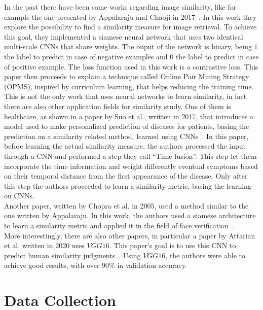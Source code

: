\documentclass[conference]{IEEEtran}
\begin{document}
				\noindent In the past there have been some works regarding image similarity, like for example the one presented by Appalaraju and Chaoji in 2017~\cite{appalaraju2017image}. In this work they explore the possibility to 
				find a similarity measure for image retrieval. To achieve this goal, they implemented a siamese neural network that uses two identical multi-scale CNNs that share weights. The ouput of the 
				network is binary, being $1$ the label to predict in case of negative examples and $0$ the label to predict in case of positive example. The loss function used in this work is a contrastive loss. This paper 
				then proceeds to explain a technique called Online Pair Mining Strategy (OPMS), inspired by curriculum learning, that helps reducing the training time. \\
				This is not the only work that uses neural networks to learn similarity, in fact there are also other application fields for similarity study. One of them is healthcare, as shown in a paper by Suo et al., written in 
				2017, that introduces a model used to make personalized prediction of diseases for patients, basing the prediction on a similarity related method, learned using CNNs~\cite{8217759}. In this paper, before 
				learning the actual similarity measure, the authors processed the input through a CNN and performed a step they call ``Time fusion''. This step let them incorporate the time information and 
				weight differently eventual symptoms based on their temporal distance from the first appearance of the disease. Only after this step the authors proceeded to learn a similarity metric, basing the learning 
				on CNNs.\\
				Another paper, written by Chopra et al. in 2005, used a method similar to the one written by Appalaraju. In this work, the authors used a siamese architecture to learn a similarity metric and applied it 
				in the field of face verification~\cite{chopra2005learning}.\\
				More interestingly, there are also other papers, in particular a paper by Attarian et al. written in 2020 uses $VGG16$. This paper's goal is to use this CNN to predict human similarity 
				judgments~\cite{attarian2020transforming}. Using $VGG16$, the authors were able to achieve good results, with over 90\% in validation accuracy.
				
	\section{Data Collection}
\end{document}
